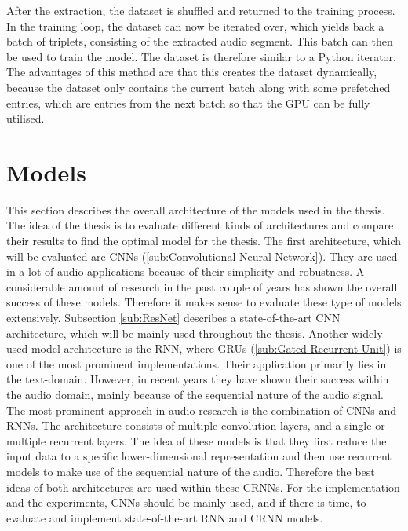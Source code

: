 \newline
\newline
After the extraction, the dataset is shuffled and returned to the training process. In the training loop, the dataset can now be iterated over, which yields back a batch of triplets, consisting of the extracted audio segment. This batch can then be used to train the model. The dataset is therefore similar to a Python iterator.
\newline
\newline
The advantages of this method are that this creates the dataset dynamically, because the dataset only contains the current batch along with some prefetched entries, which are entries from the next batch so that the \gls{GPU} can be fully utilised.

\section{Models}
\label{sec:Models}
This section describes the overall architecture of the models used in the thesis. The idea of the thesis is to evaluate different kinds of architectures and compare their results to find the optimal model for the thesis.
\newline
\newline
The first architecture, which will be evaluated are \glspl{CNN} (\ref{sub:Convolutional-Neural-Network}). They are used in a lot of audio applications because of their simplicity and robustness. A considerable amount of research in the past couple of years has shown the overall success of these models. Therefore it makes sense to evaluate these type of models extensively. Subsection \ref{sub:ResNet} describes a state-of-the-art \gls{CNN} architecture, which will be mainly used throughout the thesis.
\newline
\newline
Another widely used model architecture is the \gls{RNN}, where \glspl{GRU} (\ref{sub:Gated-Recurrent-Unit}) is one of the most prominent implementations. Their application primarily lies in the text-domain. However, in recent years they have shown their success within the audio domain, mainly because of the sequential nature of the audio signal.
\newline
\newline
The most prominent approach in audio research is the combination of \glspl{CNN} and \glspl{RNN}. The architecture consists of multiple convolution layers, and a single or multiple recurrent layers. The idea of these models is that they first reduce the input data to a specific lower-dimensional representation and then use recurrent models to make use of the sequential nature of the audio. Therefore the best ideas of both architectures are used within these \glspl{CRNN}.
\newline
\newline
For the implementation and the experiments, \glspl{CNN} should be mainly used, and if there is time, to evaluate and implement state-of-the-art \gls{RNN} and \gls{CRNN} models.


